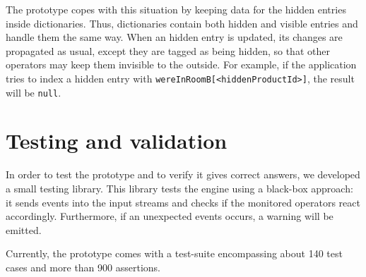The prototype copes with this situation by keeping data for the hidden
entries inside dictionaries. Thus, dictionaries contain both hidden
and visible entries and handle them the same way. When an hidden entry
is updated, its changes are propagated as usual, except they are
tagged as being hidden, so that other operators may keep them
invisible to the outside. For example, if the application tries to
index a hidden entry with \verb=wereInRoomB[<hiddenProductId>]=, the
result will be \verb=null=.


\section{Testing and validation}
\label{sec:testing}

In order to test the prototype and to verify it gives correct answers,
we developed a small testing library. This library tests the engine
using a black-box approach: it sends events into the input streams and
checks if the monitored operators react accordingly. Furthermore, if
an unexpected events occurs, a warning will be emitted.

Currently, the prototype comes with a test-suite encompassing about
140 test cases and more than 900 assertions.
